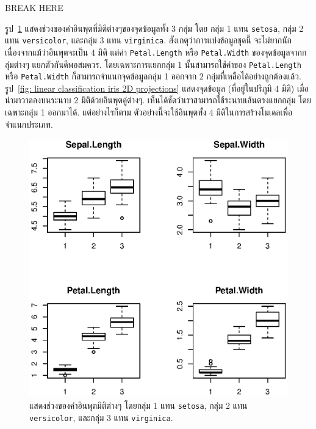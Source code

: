 BREAK HERE

รูป~\ref{fig: linear classification iris boxplot} แสดงช่วงของค่าอินพุตที่มิติต่างๆของจุดข้อมูลทั้ง $3$ กลุ่ม โดย
กลุ่ม 1 แทน \texttt{setosa}, 
กลุ่ม 2 แทน \texttt{versicolor}, 
และกลุ่ม 3 แทน \texttt{virginica}.
สังเกตุว่าการแบ่งข้อมูลชุดนี้ จะไม่ยากนัก เนื่องจากแม้ว่าอินพุตจะเป็น $4$ มิติ แต่ค่า \texttt{Petal.Length} หรือ \texttt{Petal.Width} ของจุดข้อมูลจากกลุ่มต่างๆ แยกตัวกันดีพอสมควร.
โดยเฉพาะการแยกกลุ่ม 1 นั้นสามารถใช้ค่าของ \texttt{Petal.Length} หรือ \texttt{Petal.Width} ก็สามารถจำแนกจุดข้อมูลกลุ่ม 1 ออกจาก $2$ กลุ่มที่เหลือได้อย่างถูกต้องแล้ว.
รูป~\ref{fig: linear classification iris 2D projections} แสดงจุดข้อมูล (ที่อยู่ในปริภูมิ $4$ มิติ) เมื่อนำมาวาดลงบนระนาบ $2$ มิติด้วยอินพุตคู่ต่างๆ.
เห็นได้ชัดว่าเราสามารถใช้ระนาบเส้นตรงแยกกลุ่ม โดยเฉพาะกลุ่ม 1 ออกมาได้.
%
แต่อย่างไรก็ตาม %
ตัวอย่างนี้จะใช้อินพุตทั้ง $4$ มิติในการสร้างโมเดลเพื่อจำแนกประเภท.

% 
\begin{figure}
\begin{center}
\includegraphics[width=5.5in]{03Linear/irisBoxplot.eps}
\end{center}
\caption{แสดงช่วงของค่าอินพุตมิติต่างๆ 
โดยกลุ่ม 1 แทน \texttt{setosa}, 
กลุ่ม 2 แทน \texttt{versicolor}, 
และกลุ่ม 3 แทน \texttt{virginica}.}
\label{fig: linear classification iris boxplot}
\end{figure}
%

